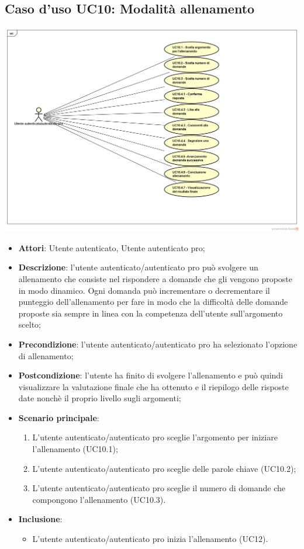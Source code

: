 \subsection{Caso d'uso UC10: Modalità allenamento}
\begin{center}
\includegraphics[scale=0.5]{UML/UC10.png}
\end{center}
\begin{itemize}
\item\textbf{Attori}: Utente autenticato, Utente autenticato pro;
\item\textbf{Descrizione}: l'utente autenticato/autenticato pro può svolgere un allenamento che consiste nel rispondere a domande che gli vengono proposte in modo dinamico. Ogni domanda può incrementare o decrementare il punteggio dell'allenamento per fare in modo che la difficoltà delle domande proposte sia sempre in linea con la competenza dell'utente sull'argomento scelto;
\item\textbf{Precondizione}: l'utente autenticato/autenticato pro ha selezionato l'opzione di allenamento;
\item\textbf{Postcondizione}: l'utente ha finito di svolgere l'allenamento e può quindi visualizzare la valutazione finale che ha ottenuto e il riepilogo delle risposte date nonchè il proprio livello sugli argomenti;
\item\textbf{Scenario principale}:
	\begin{enumerate}
		\item L'utente autenticato/autenticato pro sceglie l'argomento per iniziare l'allenamento (UC10.1);
		\item L'utente autenticato/autenticato pro sceglie delle parole chiave (UC10.2);
		\item L'utente autenticato/autenticato pro sceglie il numero di domande che compongono l'allenamento (UC10.3).
	\end{enumerate}
\item \textbf{Inclusione}:
	\begin{itemize}
		\item L'utente autenticato/autenticato pro inizia l'allenamento (UC12).
	\end{itemize}
\end{itemize}

